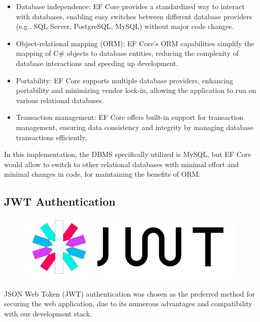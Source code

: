 \begin{itemize}

    \item Database independence: EF Core provides a standardized way to interact with databases, enabling easy switches between different database providers (e.g., SQL Server, PostgreSQL, MySQL) without major code changes.
    \item Object-relational mapping (ORM): EF Core's ORM capabilities simplify the mapping of C\# objects to database entities, reducing the complexity of database interactions and speeding up development.
    \item Portability: EF Core supports multiple database providers, enhancing portability and minimizing vendor lock-in, allowing the application to run on various relational databases.
    \item Transaction management: EF Core offers built-in support for transaction management, ensuring data consistency and integrity by managing database transactions efficiently.

\end{itemize}

In this implementation, the DBMS specifically utilized is MySQL, but EF Core would allow to switch to other relational databases with minimal effort and minimal changes in code, for maintaining the benefits of ORM.

\subsection{JWT Authentication}

\begin{figure}[H]
    \hfill
    \includegraphics[width=0.1\linewidth]{../assets/tools-logos/jwt.png}
    \hspace{1cm}
\end{figure}

JSON Web Token (JWT) authentication was chosen as the preferred method for securing the web application, due to its numerous advantages and compatibility with our development stack.

